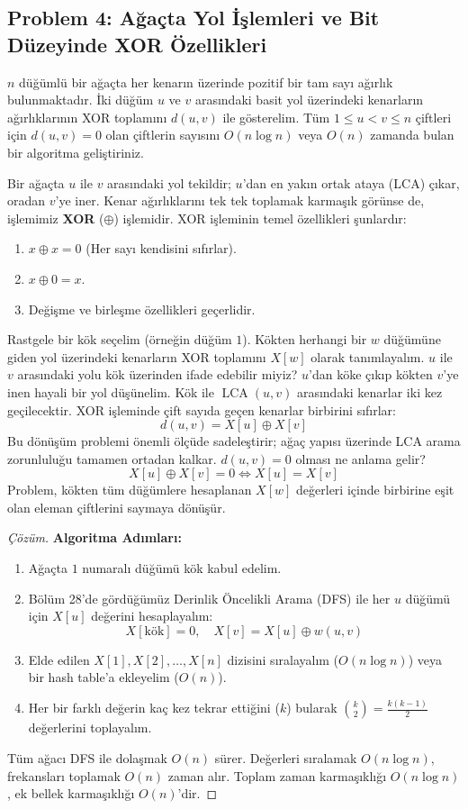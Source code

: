 \subsection{Problem 4: Ağaçta Yol İşlemleri ve Bit Düzeyinde XOR Özellikleri}

\begin{example}
$n$ düğümlü bir ağaçta her kenarın üzerinde pozitif bir tam sayı ağırlık bulunmaktadır.
İki düğüm $u$ ve $v$ arasındaki basit yol üzerindeki kenarların ağırlıklarının XOR toplamını $d(u, v)$ ile gösterelim.
Tüm $1 \le u < v \le n$ çiftleri için $d(u, v) = 0$ olan çiftlerin sayısını $O(n \log n)$ veya $O(n)$ zamanda bulan bir algoritma geliştiriniz.
\end{example}

Bir ağaçta $u$ ile $v$ arasındaki yol tekildir; $u$'dan en yakın ortak ataya (LCA) çıkar, oradan $v$'ye iner. Kenar ağırlıklarını tek tek toplamak karmaşık görünse de, işlemimiz \textbf{XOR} ($\oplus$) işlemidir.
XOR işleminin temel özellikleri şunlardır:
\begin{enumerate}
    \item $x \oplus x = 0$ (Her sayı kendisini sıfırlar).
    \item $x \oplus 0 = x$.
    \item Değişme ve birleşme özellikleri geçerlidir.
\end{enumerate}
Rastgele bir kök seçelim (örneğin düğüm $1$). Kökten herhangi bir $w$ düğümüne giden yol üzerindeki kenarların XOR toplamını $X[w]$ olarak tanımlayalım.
$u$ ile $v$ arasındaki yolu kök üzerinden ifade edebilir miyiz?
$u$'dan köke çıkıp kökten $v$'ye inen hayali bir yol düşünelim. Kök ile $\operatorname{LCA}(u, v)$ arasındaki kenarlar iki kez geçilecektir. XOR işleminde çift sayıda geçen kenarlar birbirini sıfırlar:
\[
d(u, v) = X[u] \oplus X[v]
\]
Bu dönüşüm problemi önemli ölçüde sadeleştirir; ağaç yapısı üzerinde LCA arama zorunluluğu tamamen ortadan kalkar.
$d(u, v) = 0$ olması ne anlama gelir?
\[
X[u] \oplus X[v] = 0 \iff X[u] = X[v]
\]
Problem, kökten tüm düğümlere hesaplanan $X[w]$ değerleri içinde birbirine eşit olan eleman çiftlerini saymaya dönüşür.

\begin{proof}[Çözüm]
\textbf{Algoritma Adımları:}
\begin{enumerate}
    \item Ağaçta $1$ numaralı düğümü kök kabul edelim.
    \item Bölüm 28'de gördüğümüz Derinlik Öncelikli Arama (DFS) ile her $u$ düğümü için $X[u]$ değerini hesaplayalım:
    \[
    X[\text{kök}] = 0, \quad X[v] = X[u] \oplus w(u, v)
    \]
    \item Elde edilen $X[1], X[2], \dots, X[n]$ dizisini sıralayalım ($O(n \log n)$) veya bir hash table'a ekleyelim ($O(n)$).
    \item Her bir farklı değerin kaç kez tekrar ettiğini ($k$) bularak $\binom{k}{2} = \frac{k(k-1)}{2}$ değerlerini toplayalım.
\end{enumerate}
Tüm ağacı DFS ile dolaşmak $O(n)$ sürer. Değerleri sıralamak $O(n \log n)$, frekansları toplamak $O(n)$ zaman alır. Toplam zaman karmaşıklığı $O(n \log n)$, ek bellek karmaşıklığı $O(n)$'dir.
\end{proof}

